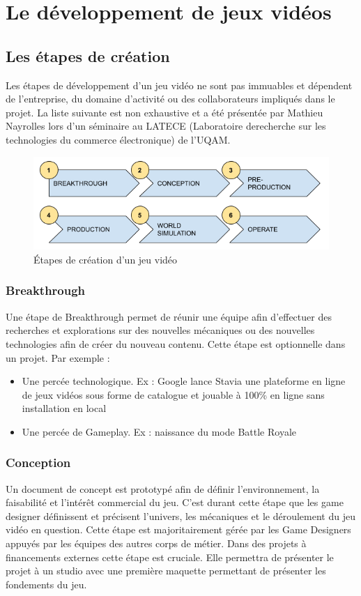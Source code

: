 \chapter{Le développement de jeux vidéos}
 
 
\section{Les étapes de création}
Les étapes de développement d'un jeu vidéo ne sont pas immuables et dépendent de l'entreprise, du domaine d'activité ou des collaborateurs impliqués dans le projet. La liste suivante est non exhaustive et a été présentée par Mathieu Nayrolles lors d’un séminaire au LATECE (Laboratoire derecherche sur les technologies du commerce électronique) de l’UQAM.
\begin{figure}[H]
    \centering
    \includegraphics[width=14cm]{10_img/production_stages.png} 
    \caption{Étapes de création d'un jeu vidéo}
\end{figure}
\subsection{Breakthrough}
Une étape de Breakthrough permet de réunir une équipe afin d'effectuer des recherches et explorations sur des nouvelles mécaniques ou des nouvelles technologies afin de créer du nouveau contenu. Cette étape est optionnelle dans un projet.
Par exemple :
\begin{itemize}
    \item Une percée technologique. Ex : Google lance Stavia une plateforme en ligne de jeux vidéos sous forme de catalogue et jouable à 100\% en ligne sans installation en local
    \item Une percée de Gameplay. Ex : naissance du mode Battle Royale
\end{itemize}

\subsection{Conception}
Un document de concept est prototypé afin de définir l'environnement, la faisabilité et l'intérêt commercial du jeu. C'est durant cette étape que les game designer définissent et précisent l'univers, les mécaniques et le déroulement du jeu vidéo en question. Cette étape est majoritairement gérée par les Game Designers appuyés par les équipes des autres corps de métier. Dans des projets à financements externes cette étape est cruciale. Elle permettra de présenter le projet à un studio avec une première maquette permettant de présenter les fondements du jeu.

